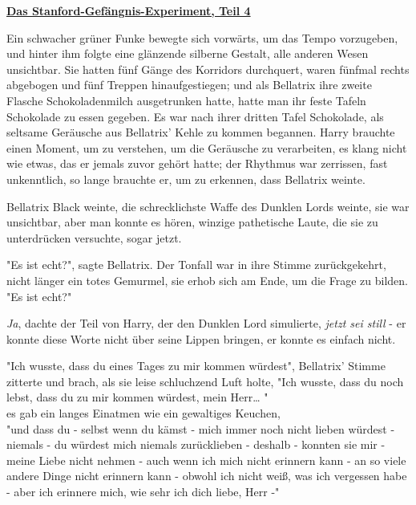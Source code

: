

\hypertarget{das-stanford-gefuxe4ngnis-experiment-teil-4}{%

\textbf{\uline{Das Stanford-Gefängnis-Experiment, Teil 4}}

Ein schwacher grüner Funke bewegte sich vorwärts, um das Tempo vorzugeben, und hinter ihm folgte eine glänzende silberne Gestalt, alle anderen Wesen unsichtbar. Sie hatten fünf Gänge des Korridors durchquert, waren fünfmal rechts abgebogen und fünf Treppen hinaufgestiegen; und als Bellatrix ihre zweite Flasche Schokoladenmilch ausgetrunken hatte, hatte man ihr feste Tafeln Schokolade zu essen gegeben. Es war nach ihrer dritten Tafel Schokolade, als seltsame Geräusche aus Bellatrix' Kehle zu kommen begannen. Harry brauchte einen Moment, um zu verstehen, um die Geräusche zu verarbeiten, es klang nicht wie etwas, das er jemals zuvor gehört hatte; der Rhythmus war zerrissen, fast unkenntlich, so lange brauchte er, um zu erkennen, dass Bellatrix weinte.

Bellatrix Black weinte, die schrecklichste Waffe des Dunklen Lords weinte, sie war unsichtbar, aber man konnte es hören, winzige pathetische Laute, die sie zu unterdrücken versuchte, sogar jetzt.

"Es ist echt?", sagte Bellatrix. Der Tonfall war in ihre Stimme zurückgekehrt, nicht länger ein totes Gemurmel, sie erhob sich am Ende, um die Frage zu bilden. "Es ist echt?"

\emph{Ja}, dachte der Teil von Harry, der den Dunklen Lord simulierte, \emph{jetzt sei still} - er konnte diese Worte nicht über seine Lippen bringen, er konnte es einfach nicht.

"Ich wusste, dass du eines Tages zu mir kommen würdest", Bellatrix' Stimme zitterte und brach, als sie leise schluchzend Luft holte, "Ich wusste, dass du noch lebst, dass du zu mir kommen würdest, mein Herr… "\\ es gab ein langes Einatmen wie ein gewaltiges Keuchen,\\ "und dass du - selbst wenn du kämst - mich immer noch nicht lieben würdest - niemals - du würdest mich niemals zurücklieben - deshalb - konnten sie mir - meine Liebe nicht nehmen - auch wenn ich mich nicht erinnern kann - an so viele andere Dinge nicht erinnern kann - obwohl ich nicht weiß, was ich vergessen habe - aber ich erinnere mich, wie sehr ich dich liebe, Herr -"

}
